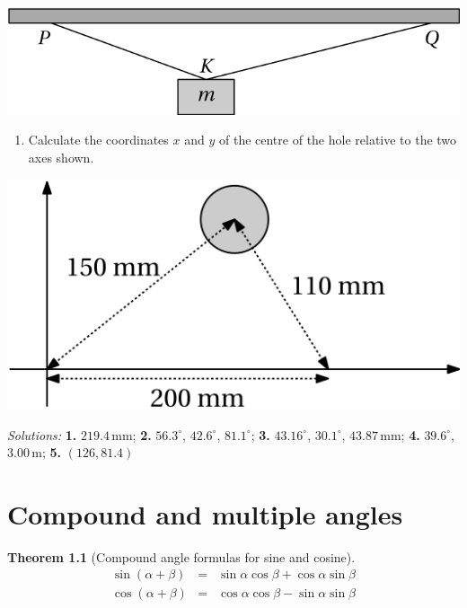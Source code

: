 \documentclass[
  12pt,
  oneside]{book}
\providecommand{\tightlist}{%
  \setlength{\itemsep}{0pt}\setlength{\parskip}{0pt}}
\newtheorem{theorem}{Theorem}[chapter]
\theoremstyle{definition}
\theoremstyle{definition}
\theoremstyle{definition}
\theoremstyle{definition}
\theoremstyle{remark}
\begin{document}
\begin{center}\includegraphics{t19-beam} \end{center}

\begin{enumerate}
\def\labelenumi{\arabic{enumi}.}
\setcounter{enumi}{4}
\tightlist
\item
  Calculate the coordinates \(x\) and \(y\) of the centre of the hole relative to the two axes shown.
\end{enumerate}

\begin{center}\includegraphics{t19-hole} \end{center}

\emph{Solutions:}
\textbf{1.} \(219.4\,\mathrm{mm}\);
\textbf{2.} \(56.3^\circ\), \(42.6^\circ\), \(81.1^\circ\);
\textbf{3.} \(43.16^\circ\), \(30.1^\circ\), \(43.87\,\mathrm{mm}\);
\textbf{4.} \(39.6^\circ\), \(3.00\,\mathrm{m}\);
\textbf{5.} \((126,81.4)\)

\hypertarget{compound-and-multiple-angles}{%
\chapter{Compound and multiple angles}\label{compound-and-multiple-angles}}

\begin{theorem}[Compound angle formulas for sine and cosine]
\protect\hypertarget{thm:t20-compsin}{}\label{thm:t20-compsin}\[
\boxed{
\begin{array}{rcl}
\sin(\alpha+\beta) &=& \sin\alpha\cos\beta + \cos\alpha\sin\beta\\
\cos(\alpha+\beta) &=& \cos\alpha\cos\beta - \sin\alpha\sin\beta
\end{array}
}\]
\end{theorem}
\end{document}
